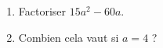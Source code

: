
\begin{exercice}\label{exo2smath-0135}

    \begin{enumerate}
        \item
    Factoriser \( 15a^2-60a\). 
\item
    Combien cela vaut si \( a=4\) ?
    \end{enumerate}

\end{exercice}
